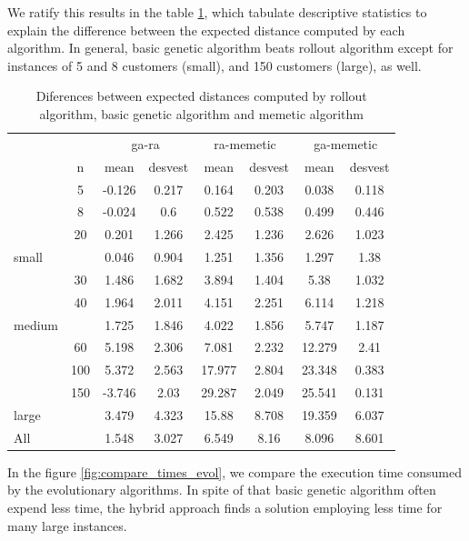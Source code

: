 We ratify this results in the table \ref{tb:diferences_expected_distance}, which tabulate descriptive statistics to explain the difference between the expected distance computed by each algorithm. In general, basic genetic algorithm beats rollout algorithm except for instances of 5 and 8 customers (small), and 150 customers (large), as well.

\begin{table}
\begin{tabular}{l c c c c c c c}
 &  & \multicolumn{2}{c}{ga-ra} & \multicolumn{2}{c}{ra-memetic}  & \multicolumn{2}{c}{ga-memetic}\\
\cline{3-8}
 & n & mean & desvest & mean & desvest & mean & desvest\\
\hline
 & 5 & -0.126 & 0.217 & 0.164 & 0.203 & 0.038 & 0.118\\
 & 8 & -0.024 & 0.6 & 0.522 & 0.538 & 0.499 & 0.446\\
 & 20 & 0.201 & 1.266 & 2.425 & 1.236 & 2.626 & 1.023\\
\hline
small &  & 0.046 & 0.904 & 1.251 & 1.356 & 1.297 & 1.38\\
\hline
 & 30 & 1.486 & 1.682 & 3.894 & 1.404 & 5.38 & 1.032\\
 & 40 & 1.964 & 2.011 & 4.151 & 2.251 & 6.114 & 1.218\\
\hline
medium &  & 1.725 & 1.846 & 4.022 & 1.856 & 5.747 & 1.187\\
\hline
 & 60 & 5.198 & 2.306 & 7.081 & 2.232 & 12.279 & 2.41\\
 & 100 & 5.372 & 2.563 & 17.977 & 2.804 & 23.348 & 0.383\\
 & 150 & -3.746 & 2.03 & 29.287 & 2.049 & 25.541 & 0.131\\
\hline
large &  & 3.479 & 4.323 & 15.88 & 8.708 & 19.359 & 6.037\\
\hline
All &  & 1.548 & 3.027 & 6.549 & 8.16 & 8.096 & 8.601\\
\hline
\end{tabular}
\caption{Diferences between expected distances computed by rollout algorithm, basic genetic algorithm and memetic algorithm}\label{tb:diferences_expected_distance}
\end{table}

In the figure \ref{fig:compare_times_evol}, we compare the execution time consumed by the evolutionary algorithms. In spite of that basic genetic algorithm often expend less time, the hybrid approach finds a solution employing less time for many large instances.


